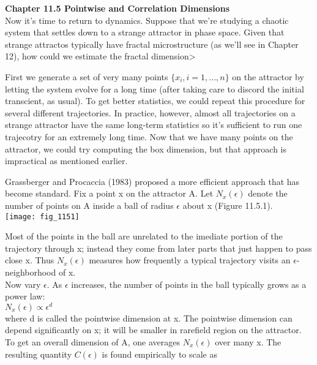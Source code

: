 \documentclass{article}
\newcommand\tab[1][1cm]{\hspace*{#1}}
\begin{document}
\textbf {Chapter 11.5 Pointwise and Correlation Dimensions} \\

Now it's time to return to dynamics. Suppose that we're studying a chaotic system that settles down to a strange attractor in phase space. Given that strange attractos typically have fractal microstructure (as we'll see in Chapter 12), how could we estimate the fractal dimension> \\ \tab

First we generate a set of very many points $\{x_{i}, i=1,...,n\}$ on the attractor by letting the system evolve for a long time (after taking care to discord the initial transcient, as usual). To get better statistics, we could repeat this procedure for several different trajectories. In practice, however, almost all trajectories on a strange attractor have the same long-term statistics so it's sufficient to run one trajecotry for an extremely long time. Now that we have many points on the attractor, we could try computing the box dimension, but that approach is impractical as mentioned earlier. \\ \tab

Grassberger and Procaccia (1983) proposed a more efficient approach that has become standard. Fix a point x on the attractor A. Let $N_{x}(\epsilon)$ denote the number of points on A inside a ball of radius $\epsilon$ about x (Figure 11.5.1). \\

\texttt{[image: fig\_1151]}

Most of the points in the ball are unrelated to the imediate portion of the trajectory through x; instead they come from later parts that just happen to pass close x. Thus $N_{x}(\epsilon)$ measures how frequently a typical trajectory visits an $\epsilon$-neighborhood of x.
\\ \tab
Now vary $\epsilon$. As $\epsilon$ increases, the number of points in the ball typically grows as a power law: \\ \tab \tab
$N_{x}(\epsilon) \propto \epsilon^{d}$ \\ 

where d is called the pointwise dimension at x. The pointwise dimension can depend significantly on x; it will be smaller in rarefield region on the attractor. To get an overall dimension of A, one averages $N_{x}(\epsilon)$ over many x. The resulting quantity $C(\epsilon)$ is found empirically to scale as \\ \tab \tab
\end{document}
